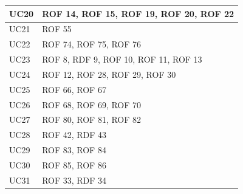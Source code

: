 \documentclass[12pt, oneside]{article}
\begin{document}
\begin{longtable}{|p{4cm}|p{12cm}|}
    UC20 & ROF 14, ROF 15, ROF 19, ROF 20, ROF 22\\
    \hline
    UC21 & ROF 55 \\
    \hline
    UC22 & ROF 74, ROF 75, ROF 76 \\
    \hline
    UC23 & ROF 8, RDF 9, ROF 10, ROF 11, ROF 13 \\
    \hline
    UC24 & ROF 12, ROF 28, ROF 29, ROF 30\\
    \hline
    UC25 & ROF 66, ROF 67 \\
    \hline
    UC26 & ROF 68, ROF 69, ROF 70 \\
    \hline
    UC27 & ROF 80, ROF 81, ROF 82 \\
    \hline
    UC28 & ROF 42, RDF 43 \\
    \hline
    UC29 & ROF 83, ROF 84 \\
    \hline
    UC30 & ROF 85, ROF 86 \\
    \hline
    UC31 & ROF 33, RDF 34 \\
    \hline

    
    
\end{longtable}
\end{document}
